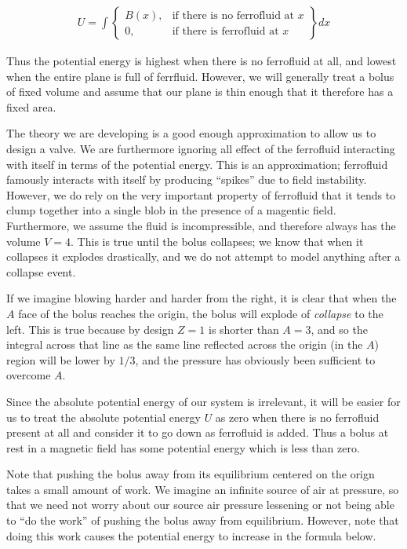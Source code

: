 \documentclass{asme2ej}
\begin{document}
\begin{align}
  U = \int
\left\{
    \begin{array}{lr}
      B(x)  , & \text{if there is no ferrofluid at } x \\
      0 , & \text{if there is ferrofluid at } x
    \end{array}
\right\} dx
\end{align}

Thus the potential energy is highest when there is no ferrofluid at all,
and lowest when the entire plane is full of ferrfluid.
However, we will generally treat a bolus of fixed volume and assume
that our plane is thin enough that it therefore has a fixed area.


The theory we are developing is a good enough approximation
to allow us to design a valve.
We are furthermore ignoring all effect of the ferrofluid
interacting with itself in terms
of the potential energy.
This is an approximation; ferrofluid famously interacts with itself
by producing ``spikes'' due to field instability.
However, we do rely on the very important property of ferrofluid that
it tends to clump together into a single blob in the presence
of a magentic field.
Furthermore,
we assume the fluid is incompressible,
and therefore always has the volume $V = 4$.
This is true until the bolus collapses; we know that
when it collapses it explodes drastically,
and we do not attempt to model anything after
a collapse event.

If we imagine blowing harder and harder from the right, it is
clear that when the $A$ face of the bolus reaches the origin,
the bolus will explode of {\em collapse} to the left.
This is true because by design $Z =1 $ is shorter than $A =3$, and
so the integral across that line as the same line reflected across
the origin (in the $A$) region will be lower by $1/3$, and the pressure
has obviously been sufficient to overcome $A$.

Since the absolute potential energy of our system is irrelevant,
it will be easier for us to treat the absolute potential energy $U$
as zero when there is no ferrofluid present at all and consider it to go down as ferrofluid is added.
Thus a bolus at rest in a magnetic field has some potential energy which is
less than zero.

Note that pushing the bolus away from its equilibrium
centered on the orign takes a small amount of work.
We imagine an infinite source
of air at pressure, so that we need not worry
about our source air pressure lessening or not being able
to ``do the work'' of pushing the bolus away from equilibrium.
However, note that doing this work
causes the potential energy to increase in the formula below.
\end{document}
